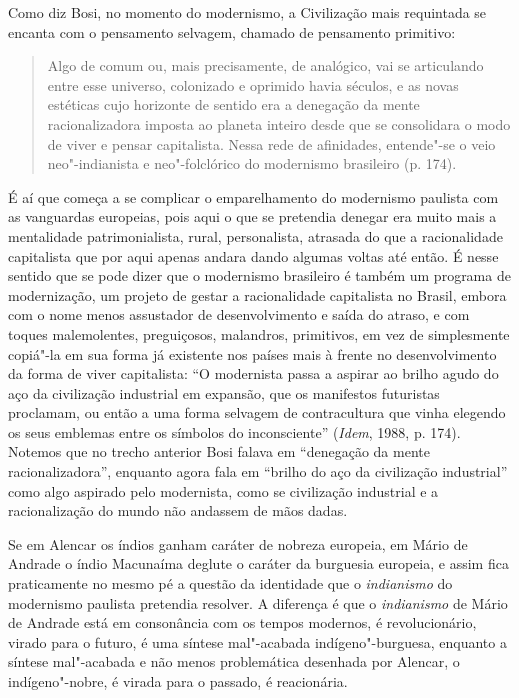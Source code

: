 Como diz Bosi, no momento do modernismo, a Civilização mais requintada se encanta com o pensamento selvagem, chamado de pensamento primitivo:

\begin{quote}
Algo de comum ou, mais precisamente, de analógico, vai se articulando
entre esse universo, colonizado e oprimido havia séculos, e as novas
estéticas cujo horizonte de sentido era a denegação da mente
racionalizadora imposta ao planeta inteiro desde que se consolidara o
modo de viver e pensar capitalista. Nessa rede de afinidades, entende"-se
o veio neo"-indianista e neo"-folclórico do modernismo brasileiro (p. 174).
\end{quote}

É aí que começa a se complicar o emparelhamento do modernismo paulista
com as vanguardas europeias, pois aqui o que se pretendia denegar era
muito mais a mentalidade patrimonialista, rural, personalista, atrasada
do que a racionalidade capitalista que por aqui apenas andara dando
algumas voltas até então. É nesse sentido que se pode dizer que o
modernismo brasileiro é também um programa de modernização, um projeto
de gestar a racionalidade capitalista no Brasil, embora com o nome menos
assustador de desenvolvimento e saída do atraso, e com toques
malemolentes, preguiçosos, malandros, primitivos, em vez de simplesmente
copiá"-la em sua forma já existente nos países mais à frente no
desenvolvimento da forma de viver capitalista: ``O modernista passa a
aspirar ao brilho agudo do aço da civilização industrial em expansão,
que os manifestos futuristas proclamam, ou então a uma forma selvagem de
contracultura que vinha elegendo os seus emblemas entre os símbolos do
inconsciente'' (\emph{Idem}, 1988, p. 174). Notemos que no trecho anterior
Bosi falava em ``denegação da mente racionalizadora'', enquanto agora
fala em ``brilho do aço da civilização industrial'' como algo aspirado
pelo modernista, como se civilização industrial e a racionalização do
mundo não andassem de mãos dadas.

Se em Alencar os índios ganham caráter de nobreza europeia, em Mário de
Andrade o índio Macunaíma deglute o caráter da burguesia europeia, e
assim fica praticamente no mesmo pé a questão da identidade que o
\emph{indianismo} do modernismo paulista pretendia resolver. A diferença
é que o \emph{indianismo} de Mário de Andrade está em consonância com os
tempos modernos, é revolucionário, virado para o futuro, é uma síntese
mal"-acabada indígeno"-burguesa, enquanto a síntese mal"-acabada e não
menos problemática desenhada por Alencar, o indígeno"-nobre, é virada
para o passado, é reacionária.

